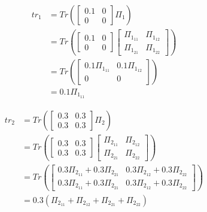 \documentclass[12pt,a4paper]{article}
\begin{document}
    \noindent\begin{minipage}{.5\linewidth}
        \begin{align}
            tr_1 & = Tr( \begin{bmatrix} 0.1 & 0 \\ 0 & 0 \end{bmatrix} \Pi_1 ) \nonumber \\
            & = Tr( \begin{bmatrix} 0.1 & 0 \\ 0 & 0 \end{bmatrix} \begin{bmatrix} \Pi_{1_{11}} & \Pi_{1_{12}} \\ \Pi_{1_{21}} & \Pi_{1_{22}} \end{bmatrix} ) \nonumber \\
            & = Tr( \begin{bmatrix} 0.1\Pi_{1_{11}} & 0.1 \Pi_{1_{12}} \\ 0 & 0 \end{bmatrix}) \nonumber \\
            & = 0.1\Pi_{1_{11}} \label{eq:tr_1}
        \end{align}
    \end{minipage}
    \begin{minipage}{.5\linewidth}
        \begin{align}
            tr_2 & = Tr( \begin{bmatrix} 0.3 & 0.3 \\ 0.3 & 0.3 \end{bmatrix} \Pi_2 ) \nonumber \\
            & = Tr( \begin{bmatrix} 0.3 & 0.3 \\ 0.3 & 0.3 \end{bmatrix} \begin{bmatrix} \Pi_{2_{11}} & \Pi_{2_{12}} \\ \Pi_{2_{21}} & \Pi_{2_{22}} \end{bmatrix} ) \nonumber \\
            & = Tr( \begin{bmatrix} 0.3\Pi_{2_{11}} + 0.3 \Pi_{2_{21}} & 0.3\Pi_{2_{12}} + 0.3 \Pi_{2_{22}} \\ 0.3\Pi_{2_{11}} + 0.3 \Pi_{2_{21}} & 0.3\Pi_{2_{12}} + 0.3 \Pi_{2_{22}} \end{bmatrix}) \nonumber \\
            & = 0.3(\Pi_{2_{11}} + \Pi_{2_{12}} + \Pi_{2_{21}} + \Pi_{2_{22}}) \label{eq:tr_2} \\
            \nonumber
        \end{align}
    \end{minipage}
\end{document}
